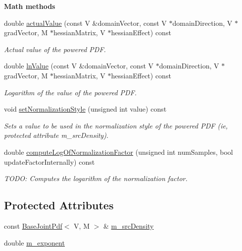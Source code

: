 \begin{Indent}{\bf Math methods}\par
\begin{DoxyCompactItemize}
\item 
double \hyperlink{class_q_u_e_s_o_1_1_powered_joint_pdf_a916888a016a1cd9aea0a7789be0f6957}{actual\-Value} (const V \&domain\-Vector, const V $\ast$domain\-Direction, V $\ast$grad\-Vector, M $\ast$hessian\-Matrix, V $\ast$hessian\-Effect) const 
\begin{DoxyCompactList}\small\item\em Actual value of the powered P\-D\-F. \end{DoxyCompactList}\item 
double \hyperlink{class_q_u_e_s_o_1_1_powered_joint_pdf_addcc8c32b3dc30d22fb1e4a8350a14e3}{ln\-Value} (const V \&domain\-Vector, const V $\ast$domain\-Direction, V $\ast$grad\-Vector, M $\ast$hessian\-Matrix, V $\ast$hessian\-Effect) const 
\begin{DoxyCompactList}\small\item\em Logarithm of the value of the powered P\-D\-F. \end{DoxyCompactList}\item 
void \hyperlink{class_q_u_e_s_o_1_1_powered_joint_pdf_a306c48af4e2954a002f873e25b4c3499}{set\-Normalization\-Style} (unsigned int value) const 
\begin{DoxyCompactList}\small\item\em Sets a value to be used in the normalization style of the powered P\-D\-F (ie, protected attribute m\-\_\-src\-Density). \end{DoxyCompactList}\item 
double \hyperlink{class_q_u_e_s_o_1_1_powered_joint_pdf_ae4d7e2a318f317652ebbf926d8a3391c}{compute\-Log\-Of\-Normalization\-Factor} (unsigned int num\-Samples, bool update\-Factor\-Internally) const 
\begin{DoxyCompactList}\small\item\em T\-O\-D\-O\-: Computes the logarithm of the normalization factor. \end{DoxyCompactList}\end{DoxyCompactItemize}
\end{Indent}
\subsection*{Protected Attributes}
\begin{DoxyCompactItemize}
\item 
const \hyperlink{class_q_u_e_s_o_1_1_base_joint_pdf}{Base\-Joint\-Pdf}$<$ V, M $>$ \& \hyperlink{class_q_u_e_s_o_1_1_powered_joint_pdf_a80cd4ecb6f5dc0e1f61d0317ef07a616}{m\-\_\-src\-Density}
\item 
double \hyperlink{class_q_u_e_s_o_1_1_powered_joint_pdf_a867f4a159b1bf2419ef049507306ce79}{m\-\_\-exponent}
\end{DoxyCompactItemize}
